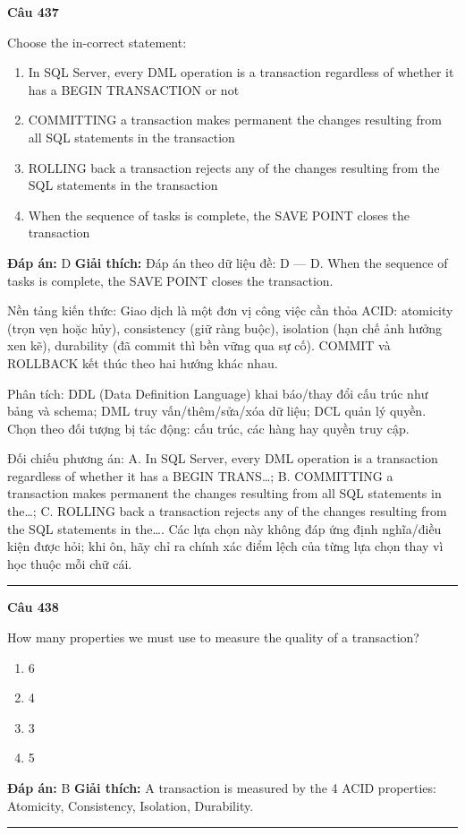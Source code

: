 \documentclass[11pt,a4paper]{article}
\newenvironment{question}[1]{%
  \par\vspace{1em}\noindent\textbf{\large Câu #1}\par\vspace{0.4em}
}{%
  \par\vspace{1em}\hrule\vspace{0.6em}
}
\newenvironment{choices}{%
  \begin{enumerate}[label=\textbf{\Alph*.},leftmargin=2.2em,itemsep=2pt,topsep=3pt]
}{%
  \end{enumerate}
}
\newcommand{\choice}{\item}
\begin{document}
\begin{question}{437}
Choose the in-correct statement:
\begin{choices}
\choice In SQL Server, every DML operation is a transaction regardless of whether it has a BEGIN TRANSACTION or not
\choice COMMITTING a transaction makes permanent the changes resulting from all SQL statements in the transaction
\choice ROLLING back a transaction rejects any of the changes resulting from the SQL statements in the transaction
\choice When the sequence of tasks is complete, the SAVE POINT closes the transaction
\end{choices}
\textbf{Đáp án:} D
\textbf{Giải thích:} Đáp án theo dữ liệu đề: D — D. When the sequence of tasks is complete, the SAVE POINT closes the transaction.

Nền tảng kiến thức: Giao dịch là một đơn vị công việc cần thỏa ACID: atomicity (trọn vẹn hoặc hủy), consistency (giữ ràng buộc), isolation (hạn chế ảnh hưởng xen kẽ), durability (đã commit thì bền vững qua sự cố). COMMIT và ROLLBACK kết thúc theo hai hướng khác nhau.

Phân tích: DDL (Data Definition Language) khai báo/thay đổi cấu trúc như bảng và schema; DML truy vấn/thêm/sửa/xóa dữ liệu; DCL quản lý quyền. Chọn theo đối tượng bị tác động: cấu trúc, các hàng hay quyền truy cập.

Đối chiếu phương án: A. In SQL Server, every DML operation is a transaction regardless of whether it has a BEGIN TRANS…; B. COMMITTING a transaction makes permanent the changes resulting from all SQL statements in the…; C. ROLLING back a transaction rejects any of the changes resulting from the SQL statements in the…. Các lựa chọn này không đáp ứng định nghĩa/điều kiện được hỏi; khi ôn, hãy chỉ ra chính xác điểm lệch của từng lựa chọn thay vì học thuộc mỗi chữ cái.
\end{question}

\begin{question}{438}
How many properties we must use to measure the quality of a transaction?
\begin{choices}
\choice 6
\choice 4
\choice 3
\choice 5
\end{choices}
\textbf{Đáp án:} B
\textbf{Giải thích:} A transaction is measured by the 4 ACID properties: Atomicity, Consistency, Isolation, Durability.
\end{question}
\end{document}
